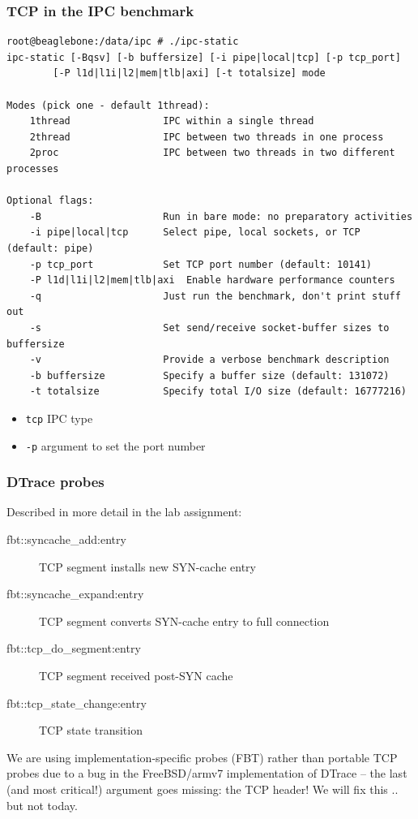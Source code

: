 \begin{frame}[fragile]
  \frametitle{TCP in the IPC benchmark}

  \begin{tiny}
    \begin{verbatim}
root@beaglebone:/data/ipc # ./ipc-static 
ipc-static [-Bqsv] [-b buffersize] [-i pipe|local|tcp] [-p tcp_port]
        [-P l1d|l1i|l2|mem|tlb|axi] [-t totalsize] mode

Modes (pick one - default 1thread):
    1thread                IPC within a single thread
    2thread                IPC between two threads in one process
    2proc                  IPC between two threads in two different processes

Optional flags:
    -B                     Run in bare mode: no preparatory activities
    -i pipe|local|tcp      Select pipe, local sockets, or TCP (default: pipe)
    -p tcp_port            Set TCP port number (default: 10141)
    -P l1d|l1i|l2|mem|tlb|axi  Enable hardware performance counters
    -q                     Just run the benchmark, don't print stuff out
    -s                     Set send/receive socket-buffer sizes to buffersize
    -v                     Provide a verbose benchmark description
    -b buffersize          Specify a buffer size (default: 131072)
    -t totalsize           Specify total I/O size (default: 16777216)
\end{verbatim}
  \end{tiny}

  \begin{itemize}
    \item \texttt{tcp} IPC type
    \item \texttt{-p} argument to set the port number
  \end{itemize}
\end{frame}

\begin{frame}
  \frametitle{DTrace probes}

  Described in more detail in the lab assignment:

  \medskip

  \begin{description}
    \item[fbt::syncache\_add:entry] TCP segment installs new SYN-cache entry
    \item[fbt::syncache\_expand:entry] TCP segment converts SYN-cache entry to
      full connection
    \item[fbt::tcp\_do\_segment:entry] TCP segment received post-SYN cache
    \item[fbt::tcp\_state\_change:entry] TCP state transition
  \end{description}

  \medskip

  \begin{scriptsize}
    We are using implementation-specific probes (FBT) rather than portable TCP
    probes due to a bug in the FreeBSD/armv7 implementation of DTrace -- the
    last (and most critical!) argument goes missing: the TCP header!  We will
    fix this .. but not today.
  \end{scriptsize}
\end{frame}

